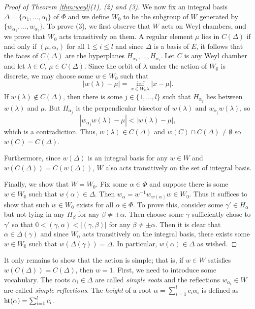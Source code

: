 \begin{proof}[Proof of Theorem \ref{thm:weyl}(1), (2) and (3)]
    We now fix an integral basis $\Delta=\{\alpha_1,\ldots,\alpha_l\}$ of $\Phi$ and we define $W_0$ to be the subgroup of $W$ generated by $\{w_{\alpha_1},\ldots,w_{\alpha_l}\}$. To prove (3), we first observe that $W$ acts on Weyl chambers, and we prove that $W_0$ acts transitively on them. A regular element $\mu$ lies in $C(\Delta)$ if and only if $(\mu,\alpha_i)$ for all $1\leq i\leq l$ and since $\Delta$ is a basis of $E$, it follows that the faces of $C(\Delta)$ are the hyperplanes $H_{\alpha_1},\ldots,H_{\alpha_l}$. Let $C$ is any Weyl chamber and let $\lambda\in C$, $\mu\in C(\Delta)$. Since the orbit of $\lambda$ under the action of $W_0$ is discrete, we may choose some $w\in W_0$ such that 
    $$|w(\lambda)-\mu|=\inf_{x\in W_0\lambda}|x-\mu|.$$
    If $w(\lambda)\not\in C(\Delta)$, then there is some $j\in\{1,\ldots,l\}$ such that $H_{\alpha_j}$ lies between $w(\lambda)$ and $\mu$. But $H_{\alpha_j}$ is the perpendicular bisector of $w(\lambda)$ and $w_{\alpha_j}w(\lambda)$, so 
    $$|w_{\alpha_j}w(\lambda)-\mu|<|w(\lambda)-\mu|,$$
    which is a contradiction. Thus, $w(\lambda)\in C(\Delta)$ and $w(C)\cap C(\Delta)\neq\emptyset$ so $w(C)=C(\Delta)$.

    Furthermore, since $w(\Delta)$ is an integral basis for any $w\in W$ and $w(C(\Delta))=C(w(\Delta))$, $W$ also acts transitively on the set of integral basis.

    Finally, we show that $W=W_0$. Fix some $\alpha\in\Phi$ and suppose there is some $w\in W_0$ such that $w(\alpha)\in\Delta$. Then $w_\alpha=w^{-1}w_{w(\alpha)}w\in W_0$. Thus it suffices to show that such $w\in W_0$ exists for all $\alpha\in\Phi$. To prove this, consider some $\gamma'\in H_\alpha$ but not lying in any $H_\beta$ for any $\beta\neq\pm\alpha$. Then choose some $\gamma$ sufficiently chose to $\gamma'$ so that $0<(\gamma,\alpha)<|(\gamma,\beta)|$ for any $\beta\neq\pm\alpha$. Then it is clear that $\alpha\in\Delta(\gamma)$ and since $W_0$ acts transitively on the integral basis, there exists some $w\in W_0$ such that $w(\Delta(\gamma))=\Delta$. In particular, $w(\alpha)\in\Delta$ as wished.
\end{proof}

It only remains to show that the action is simple; that is, if $w\in W$ satisfies $w(C(\Delta))=C(\Delta)$, then $w=1$. First, we need to introduce some vocabulary. The roots $\alpha_i\in\Delta$ are called \textit{simple roots} and the reflections $w_{\alpha_i}\in W$ are called \textit{simple reflections}. The \textit{height} of a root $\alpha=\sum_{i=1}^{l}c_i\alpha_i$ is defined as $\mathrm{ht}(\alpha)=\sum_{i=1}^{l}c_i$.

